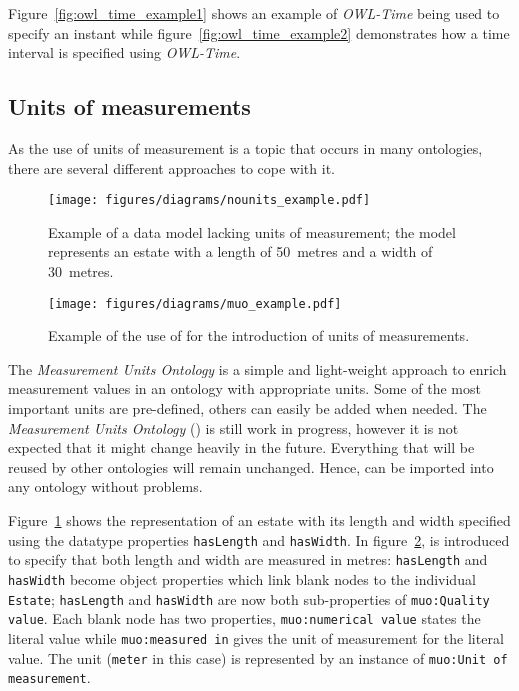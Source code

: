 Figure~\ref{fig:owl_time_example1} shows an example of \emph{OWL-Time} being used to specify an instant while figure~\ref{fig:owl_time_example2} demonstrates how a time interval is specified using \emph{OWL-Time}.

\subsection{Units of measurements}
\label{subsec:unit_ontologies}

As the use of units of measurement is a topic that occurs in many ontologies, there are several different approaches to cope with it.

\begin{figure}
\centering
\texttt{[image: figures/diagrams/nounits\_example.pdf]}
\caption{Example of a data model lacking units of measurement; the model represents an estate with a length of \SI{50}{metres} and a width of \SI{30}{metres}.}
\label{fig:nounits_example}
\end{figure}

\begin{figure}
\centering
\texttt{[image: figures/diagrams/muo\_example.pdf]}
\caption{Example of the use of \muo for the introduction of units of measurements.}
\label{fig:muo_example}
\end{figure}

The \emph{Measurement Units Ontology}\cite{MUOWeb,MUO} is a simple and light-weight approach to enrich measurement values in an ontology with appropriate units. Some of the most important units are pre-defined, others can easily be added when needed. The \emph{Measurement Units Ontology} (\muo) is still work in progress, however it is not expected that it might change heavily in the future. Everything that will be reused by other ontologies will remain unchanged. Hence, \muo can be imported into any ontology without problems.

Figure~\ref{fig:nounits_example} shows the representation of an estate with its length and width specified using the datatype properties \texttt{hasLength} and \texttt{hasWidth}. In figure~\ref{fig:muo_example}, \muo is introduced to specify that both length and width are measured in metres: \texttt{hasLength} and \texttt{hasWidth} become object properties which link blank nodes to the individual \texttt{Estate}; \texttt{hasLength} and \texttt{hasWidth} are now both sub-properties of \texttt{muo:Quality value}. Each blank node has two properties, \texttt{muo:numerical value} states the literal value while \texttt{muo:measured in} gives the unit of measurement for the literal value. The unit (\texttt{meter} in this case) is represented by an instance of \texttt{muo:Unit of measurement}.

